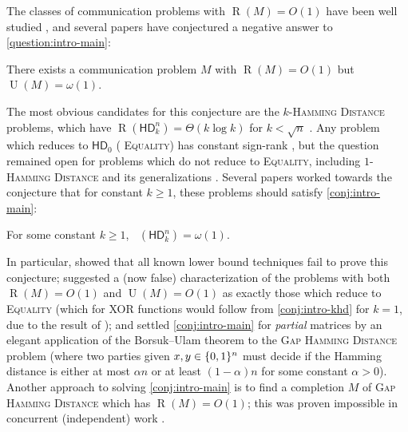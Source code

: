 \documentclass[conference]{IEEEtran}
\DeclareMathOperator{\signrank}{rank_\pm}
\DeclareMathOperator{\U}{U}
\DeclareMathOperator{\Rand}{R}
\newcommand{\HD}[1]{\mathsf{HD}_{#1}}
\begin{document}
The classes of communication problems with $\Rand(M) = O(1)$ have been well
studied \cite{HHH23,HWZ22,HHH22,DHPTU22,EHK22,CHZZ24,FHHH24,HR24,FGHH25,Tom25}, and several papers
\cite{HHPTZ22,HHM23,HH24,HZ24} have conjectured a negative answer to
\cref{question:intro-main}:

\begin{conjecture}
\label{conj:intro-main}
There exists a communication problem $M$ with $\Rand(M) = O(1)$ but $\U(M) = \omega(1)$.
\end{conjecture}

The most obvious candidates for this conjecture are the \textsc{$k$-Hamming
Distance} problems, which have $\Rand(\HD{k}^n) = \Theta(k \log k)$ for $k <
\sqrt n$ \cite{HSZZ06,Sag18}. Any problem which reduces to $\HD{0}$ (\ie
\textsc{Equality}) has constant sign-rank \cite{HHPTZ22}, but the question
remained open for problems which do not reduce to \textsc{Equality}, including
\textsc{$1$-Hamming Distance} and its generalizations \cite{HHH23,HWZ22, FHHH24,
FGHH25}. Several papers \cite{HHPTZ22,HHM23,HZ24} worked towards the conjecture
that for constant $k \geq 1$, these problems should satisfy
\cref{conj:intro-main}:

\begin{conjecture}
\label{conj:intro-khd}
For some constant $k \geq 1$, $\signrank(\HD{k}^n) = \omega(1)$.
\end{conjecture}

In particular, \cite{HHPTZ22} showed that all known lower bound techniques fail
to prove this conjecture; \cite{HZ24} suggested a (now false) characterization
of the problems with both $\Rand(M) = O(1)$ and $\U(M) = O(1)$ as exactly those
which reduce to \textsc{Equality} (which for XOR functions would follow from
\cref{conj:intro-khd} for $k=1$, due to the result of \cite{CHZZ24}); and \cite{HHM23}
settled \cref{conj:intro-main} for \emph{partial} matrices by an elegant
application of the Borsuk--Ulam theorem to the \textsc{Gap Hamming Distance}
problem (where two parties given $x,y \in \{0,1\}^n$ must decide if the Hamming
distance is either at most $\alpha n$ or at least $(1-\alpha) n$ for some
constant $\alpha > 0$). Another approach to solving \cref{conj:intro-main} is to
find a completion $M$ of \textsc{Gap Hamming Distance} which
has $\Rand(M) = O(1)$; this was proven impossible in concurrent (independent)
work \cite{BHHLT25}.
\end{document}

